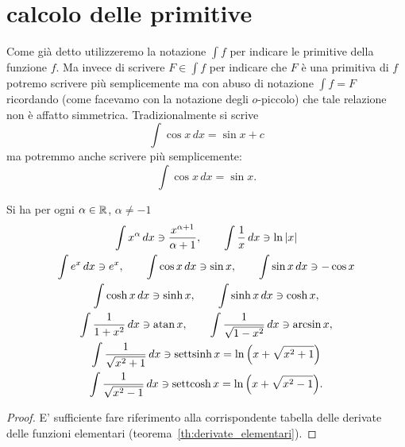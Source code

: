 \section{calcolo delle primitive}

Come già detto utilizzeremo la notazione $\int f$ per indicare le primitive
della funzione $f$.
Ma invece di scrivere $F\in \int f$
per indicare che $F$ è una primitiva di $f$
potremo scrivere
più semplicemente ma con abuso di notazione $\int f = F$
ricordando (come facevamo con la notazione degli $o$-piccolo) che tale relazione
non è affatto simmetrica.
Tradizionalmente si scrive
\begin{equation}\label{eq:4137878}
  \int \cos x\, dx = \sin x + c 
\end{equation}
ma potremmo anche scrivere più semplicemente:
%
\begin{equation}\label{eq:489417}
  \int \cos x\, dx = \sin x.
\end{equation}

\begin{theorem}
Si ha
per ogni $\alpha \in {\mathbb R}$, $\alpha\neq -1$
\begin{gather*}
\int x^\alpha\, dx \ni \frac{x^{\alpha+1}}{\alpha+1},
\qquad
\int \frac{1}{x}\, dx \ni \ln{\left|x\right|}
\\
\int e^x \, dx \ni e^x,
\qquad
\int \cos x\, dx \ni \sin x,
\qquad
\int \sin x\, dx \ni -\cos x
\\
\int \cosh x \, dx \ni \sinh x,\qquad
\int \sinh x \, dx \ni \cosh x, \\
\int \frac{1}{1+x^2}\, dx \ni \operatorname{atan} x, \qquad
\int \frac{1}{\sqrt{1-x^2}}\, dx \ni \arcsin x, \\
\int \frac{1}{\sqrt{x^2+1}}\, dx \ni \operatorname{settsinh} x = \ln{\left( x+\sqrt{x^2+1} \right)}\\
\int \frac{1}{\sqrt{x^2-1}}\, dx \ni \operatorname{settcosh} x = \ln{\left( x+\sqrt{x^2-1} \right)}.
\end{gather*}
\end{theorem}
%
\begin{proof}
E' sufficiente fare riferimento alla corrispondente tabella
delle derivate delle funzioni elementari (teorema~\ref{th:derivate_elementari}).
\end{proof}

